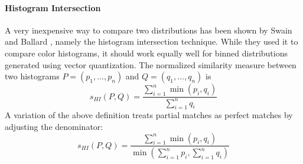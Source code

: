 \paragraph{Histogram Intersection}

A very inexpensive way to compare two distributions has been shown by Swain and
Ballard \autocite{swain_color_1991}, namely the histogram intersection
technique. While they used it to compare color histograms, it should work
equally well for binned distributions generated using vector quantization. The
normalized similarity measure between two histograms $P = (p_1, \dots, p_n)$
and $Q = (q_1, \dots, q_n)$ is
\begin{equation*}
    s_{HI}(P, Q) = \frac{\displaystyle\sum_{i=1}^n \min (p_i, q_i)}{\displaystyle\sum_{i=1}^n q_i}
\end{equation*}
A variation of the above definition treats partial matches as perfect matches
by adjusting the denominator:
\begin{equation*}
    s_{HI}(P, Q) = \frac{\displaystyle\sum_{i=1}^n \min (p_i, q_i)}{\displaystyle \min \left( \sum_{i=1}^n p_i, \sum_{i=1}^n q_i \right)}
\end{equation*}
